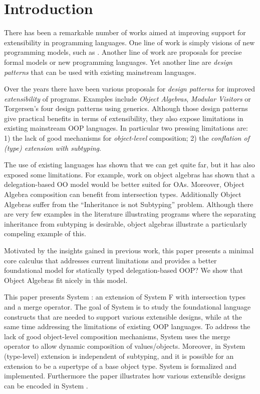 \section{Introduction}


There has been a remarkable number of works aimed at improving 
support for extensibility in programming languages. One line of work
is simply visions of new programming models, such as 
\cite{family polymorphism and virtual
classes.}. Another line of work are proposals for precise formal models or new 
programming languages. Yet another line are \emph{design patterns}
that can be used  with existing mainstream languages. 


Over the years there have been various proposals for \emph{design
  patterns} for improved \emph{extensibility} of programs.  Examples
include \emph{Object Algebras}, \emph{Modular Visitors} or Torgersen's
four design patterns using generics.  Although those design patterns
give practical benefits in terms of extensibility, they also expose
limitations in existing mainstream OOP languages. In particular two
pressing limitations are: 1) the lack of good mechanisms for
\emph{object-level} composition; 2) the \emph{conflation of (type)
  extension with subtyping}.

The use of existing languages has shown that we can get quite far, but 
it has also exposed some limitations. For example, work on object
algebras has shown that a delegation-based OO model would be better 
suited for OAs. Moreover, Object Algebra composition can benefit from 
intersection types. Additionally Object Algebras suffer from the
``Inheritance is not Subtyping'' problem. Although there are very few
examples in the literature illustrating programs where the separating 
inheritance from subtyping is desirable, object algebras illustrate a 
particularly compeling example of this. 

Motivated by the insights gained in previous work, this paper presents 
a minimal core calculus that addresses current limitations and
provides a better foundational model for statically typed
delegation-based OOP? We show that Object Algebras fit nicely in this
model. 

This paper presents System \name: an extension of System F with
intersection types and a merge operator.  The goal of System \name is
to study the foundational language constructs that are needed to
support various extensible designs, while at the same time addressing
the limitations of existing OOP languages. To address the lack of good
object-level composition mechanisms, System \name uses the merge
operator to allow dynamic composition of values/objects. Moreover, in
System \name (type-level) extension is independent of subtyping, and
it is possible for an extension to be a supertype of a base object
type.  System \name is formalized and implemented. Furthermore the
paper illustrates how various extensible designs can be encoded in
System \name.

